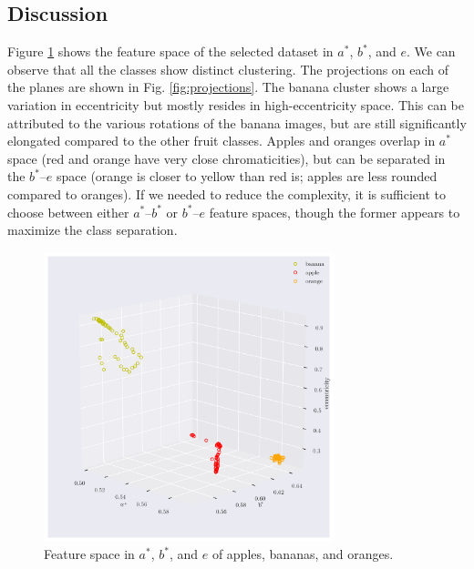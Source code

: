 \documentclass[12pt,a4paper]{article}
\begin{document}
\subsection{Discussion}
Figure \ref{fig:feature-space} shows the feature space of the selected dataset in $a^*$, $b^*$, and $e$. We can observe that all the classes show distinct clustering. The projections on each of the planes are shown in Fig. \ref{fig:projections}. The banana cluster shows a large variation in eccentricity but mostly resides in high-eccentricity space. This can be attributed to the various rotations of the banana images, but are still significantly elongated compared to the other fruit classes. Apples and oranges overlap in $a^*$ space (red and orange have very close chromaticities), but can be separated in the $b^*$--$e$ space (orange is closer to yellow than red is; apples are less rounded compared to oranges). If we needed to reduce the complexity, it is sufficient to choose between either $a^*$--$b^*$ or $b^*$--$e$ feature spaces, though the former appears to maximize the class separation.

\begin{figure}
	\centering
	\includegraphics[width=0.75\textwidth]{feature_space.png}
	\caption{Feature space in $a^*$, $b^*$, and $e$ of apples, bananas, and oranges.}
	\label{fig:feature-space}
\end{figure}
\end{document}
